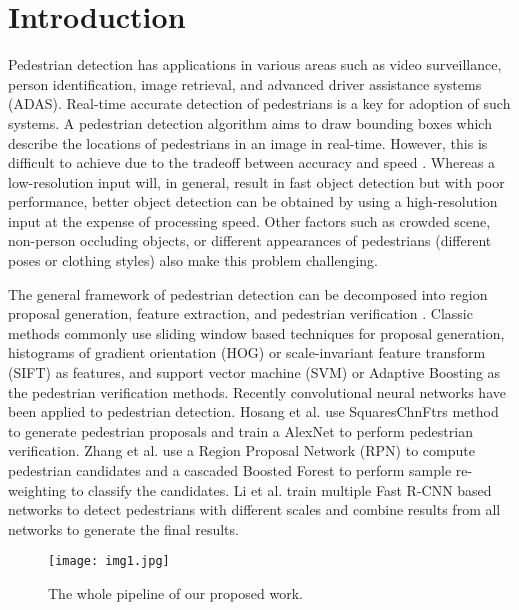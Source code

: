 \documentclass[10pt,letterpaper]{article}
\begin{document}
\section{Introduction}
Pedestrian detection has applications in various areas such as video surveillance, person identification, image retrieval, and advanced driver assistance systems (ADAS). Real-time accurate detection of pedestrians is a key for adoption of such systems. A pedestrian detection algorithm aims to draw bounding boxes which describe the locations of pedestrians in an image in real-time. However, this is difficult to achieve due to the tradeoff between accuracy and speed \cite{caltech}. Whereas a low-resolution input will, in general, result in fast object detection but with poor performance, better object detection can be obtained by using a high-resolution input at the expense of processing speed. Other factors such as crowded scene, non-person occluding objects, or different appearances of pedestrians (different poses or clothing styles) also make this problem challenging.   

The general framework of pedestrian detection can be decomposed into region proposal generation, feature extraction, and pedestrian verification \cite{pedsurvey}. Classic methods commonly use sliding window based techniques for proposal generation, histograms of gradient orientation (HOG) \cite{HOG} or scale-invariant feature transform (SIFT) \cite{SIFT} as features, and support vector machine (SVM) \cite{svm} or Adaptive Boosting \cite{adaboost} as the pedestrian verification methods. Recently convolutional neural networks have been applied to pedestrian detection. Hosang et al. \cite{SCF+AlexNet} use SquaresChnFtrs \cite{tenyears} method to generate pedestrian proposals and train a AlexNet \cite{alexnet} to perform pedestrian verification. Zhang et al. \cite{rpn} use a Region Proposal Network (RPN) \cite{fasterrcnn} to compute pedestrian candidates and a cascaded Boosted Forest \cite{bf} to perform sample re-weighting to classify the candidates. Li et al. \cite{safcnn} train multiple Fast R-CNN \cite{fastrcnn} based networks to detect pedestrians with different scales and combine results from all networks to generate the final results.

\begin{figure*}
\begin{center}
   \texttt{[image: img1.jpg]}
\end{center}
   \caption{The whole pipeline of our proposed work.}
\label{fig:short}
\end{figure*}
\end{document}
